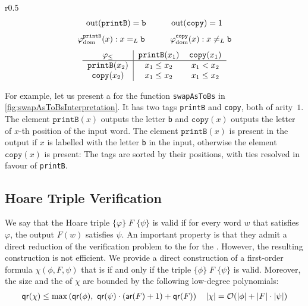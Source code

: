 \begin{wrapfigure}{r}{0.5\textwidth}
\[
\begin{tabular}{ccc}
    $\text{out}(\mathtt{printB}) = \mathtt{b}$ & \ \ \ & $\text{out}(\mathtt{copy}) = 1$ \\
\end{tabular}
\]
\[
\begin{tabular}{ccc}
    $\varphi_{\text{dom}}^{\mathtt{printB}}(x) : x =_L \mathtt{b}$ & \ \ \  &$\varphi_{\text{dom}}^{\mathtt{copy}}(x) : x \neq_L \mathtt{b}$ \\
\end{tabular}
\]
\[ 
\begin{tabular}{c|cc}
    $\varphi_{\leq}$ & $\mathtt{printB}(x_1)$ & $\mathtt{copy}(x_1)$ \\
    \hline
    $\mathtt{printB}(x_2)$ & $x_1 \leq x_2$ & $x_1 < x_2$ \\
    $\mathtt{copy}(x_2)$ & $x_1 \leq x_2$ & $x_1 \leq x_2$ \\
\end{tabular}
\]
\caption{The \texttt{swapAsToBs} interpretation.}
\label{fig:swapAsToBsInterpretation}
\end{wrapfigure}
For example, let us present a  for
the function \texttt{swapAsToBs}
in \cref{fig:swapAsToBsInterpretation}. It has two tags \texttt{printB} and
\texttt{copy}, both of arity~$1$. The element $\mathtt{printB}(x)$ outputs the
letter \texttt{b} and $\mathtt{copy}(x)$ outputs the letter of $x$-th position
of the input word.
The element $\mathtt{printB}(x)$ is present in the output if $x$ is labelled with the letter \texttt{b}
in the input, otherwise the element $\mathtt{copy}(x)$ is present:
The tags are sorted by their positions, with ties resolved in favour of \texttt{printB}.


\subsection{Hoare Triple Verification}
\label{sec:pullback}

\AP
We say that the Hoare triple $\{ \varphi \}\; F\; \{ \psi \}$ is valid if
for every word $w$ that satisfies $\varphi$, the output $F(w)$ satisfies
$\psi$. An important property 
is that they admit a direct reduction of the 
verification problem to the  for the  \cite[Theorem~1.7]{bojanczyk2018polyregular}. However,
the resulting construction is not efficient.
We provide a direct construction of a first-order formula $\chi(\phi, F, \psi)$
that is  if and only if the triple $\{ \phi \}\; F\; \{ \psi \}$ is valid.
Moreover, the size and the  of $\chi$ are bounded by the following low-degree polynomials:
\begin{align*}
    \mathop{\mathsf{qr}}(\chi) \leq \max\left(\mathop{\mathsf{qr}}(\phi),\ \mathop{\mathsf{qr}}(\psi) \cdot \left(\textsf{ar}(F) + 1\right)  + \mathop{\mathsf{qr}}(F)\right) \quad |\chi| = \mathcal{O} (|\phi| + |F| \cdot |\psi|)
\end{align*}

